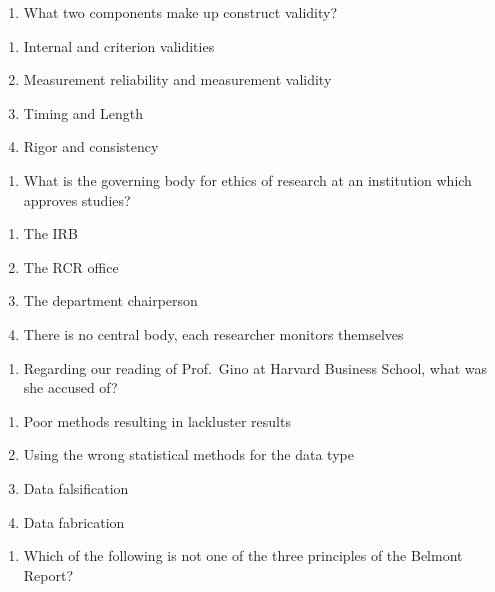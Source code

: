 \documentclass[
  12pt,
  letterpaper,
  DIV=11,
  numbers=noendperiod]{scrartcl}
\providecommand{\tightlist}{%
  \setlength{\itemsep}{0pt}\setlength{\parskip}{0pt}}\usepackage{longtable,booktabs,array}
\begin{document}
\begin{enumerate}
\def\labelenumi{\arabic{enumi}.}
\setcounter{enumi}{34}
\tightlist
\item
  What two components make up construct validity?
\end{enumerate}

\begin{enumerate}
\def\labelenumi{\alph{enumi}.}
\tightlist
\item
  Internal and criterion validities
\item
  Measurement reliability and measurement validity
\item
  Timing and Length
\item
  Rigor and consistency
\end{enumerate}

\begin{enumerate}
\def\labelenumi{\arabic{enumi}.}
\setcounter{enumi}{35}
\tightlist
\item
  What is the governing body for ethics of research at an institution
  which approves studies?
\end{enumerate}

\begin{enumerate}
\def\labelenumi{\alph{enumi}.}
\tightlist
\item
  The IRB
\item
  The RCR office
\item
  The department chairperson
\item
  There is no central body, each researcher monitors themselves
\end{enumerate}

\begin{enumerate}
\def\labelenumi{\arabic{enumi}.}
\setcounter{enumi}{36}
\tightlist
\item
  Regarding our reading of Prof.~Gino at Harvard Business School, what
  was she accused of?
\end{enumerate}

\begin{enumerate}
\def\labelenumi{\alph{enumi}.}
\tightlist
\item
  Poor methods resulting in lackluster results
\item
  Using the wrong statistical methods for the data type
\item
  Data falsification
\item
  Data fabrication
\end{enumerate}

\begin{enumerate}
\def\labelenumi{\arabic{enumi}.}
\setcounter{enumi}{37}
\tightlist
\item
  Which of the following is not one of the three principles of the
  Belmont Report?
\end{enumerate}
\end{document}
